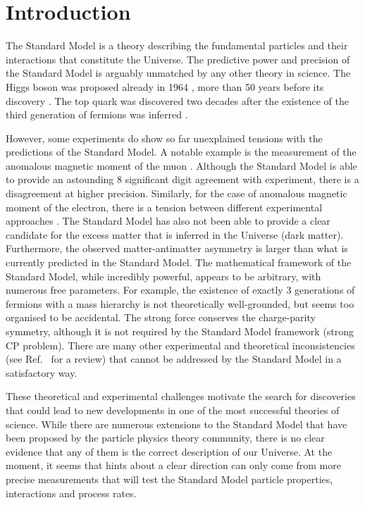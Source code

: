 \chapter{Introduction}\label{sec:introduction}

The Standard Model is a theory describing the fundamental particles and their interactions that constitute the Universe.
The predictive power and precision of the Standard Model is arguably unmatched by any other theory in science.
The Higgs boson was proposed already in 1964 \cite{PhysRevLett.13.508}, more than 50 years before its discovery \cite{ATLAS:2012yve,CMS:2012qbp}.
The top quark was discovered \cite{PhysRevLett.74.2632,PhysRevLett.74.2626} two decades after the existence of the third generation of fermions was inferred \cite{HARARI1975265}.

However, some experiments do show so far unexplained tensions with the predictions of the Standard Model. 
A notable example is the measurement of the anomalous magnetic moment of the muon \cite{PhysRevLett.126.141801}.
Although the Standard Model is able to provide an astounding 8 significant digit agreement with experiment, there is a disagreement at higher precision.
Similarly, for the case of anomalous magnetic moment of the electron, there is a tension between different experimental approaches \cite{PhysRevLett.100.120801,Morel:2020dww,Li:2021koa}.
The Standard Model has also not been able to provide a clear candidate for the excess matter that is inferred in the Universe (dark matter).
Furthermore, the observed matter-antimatter asymmetry 
is larger than what is currently predicted in the Standard Model.
The mathematical framework of the Standard Model, while incredibly powerful, appears to be arbitrary, with numerous free parameters.
For example, the existence of exactly 3 generations of fermions with a mass hierarchy is not theoretically well-grounded, but seems too organised to be accidental.
The strong force conserves the charge-parity symmetry, although it is not required by the Standard Model framework (strong CP problem).
There are many other experimental and theoretical inconsistencies (see Ref.~\cite{Ellis:2002wba} for a review) that cannot be addressed by the Standard Model in a satisfactory way.

These theoretical and experimental challenges motivate the search for discoveries that could lead to new developments in one of the most successful theories of science.
While there are numerous extensions to the Standard Model that have been proposed by the particle physics theory community, there is no clear evidence that any of them is the correct description of our Universe.
At the moment, it seems that hints about a clear direction can only come from more precise measurements that will test the Standard Model particle properties, interactions and process rates.

